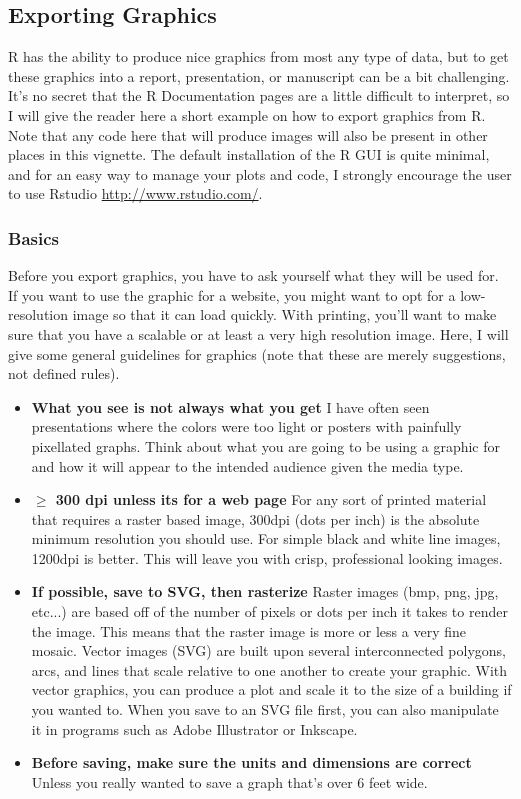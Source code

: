\documentclass[letterpaper]{article}
\newcommand{\tab}{\hspace*{1em}}
\begin{document}
\subsection{Exporting Graphics}\label{appendix:graphics}
\tab\tab R has the ability to produce nice graphics from most any type of data, but to get these graphics into a report, presentation, or manuscript can be a bit challenging. It's no secret that the R Documentation pages are a little difficult to interpret, so I will give the reader here a short example on how to export graphics from R. Note that any code here that will produce images will also be present in other places in this vignette. The default installation of the R GUI is quite minimal, and for an easy way to manage your plots and code, I strongly encourage the user to use Rstudio \url{http://www.rstudio.com/}.

\subsubsection{Basics}\label{appendix:graphics:basics}
\tab\tab Before you export graphics, you have to ask yourself what they will be used for. If you want to use the graphic for a website, you might want to opt for a low-resolution image so that it can load quickly. With printing, you'll want to make sure that you have a scalable or at least a very high resolution image. Here, I will give some general guidelines for graphics (note that these are merely suggestions, not defined rules).
\begin{itemize}
  \item \textbf{What you see is not always what you get} I have often seen presentations where the colors were too light or posters with painfully pixellated graphs. Think about what you are going to be using a graphic for and how it will appear to the intended audience given the media type.
  \item \textbf{$\geq$ 300 dpi unless its for a web page} For any sort of printed material that requires a raster based image, 300dpi (dots per inch) is the absolute minimum resolution you should use. For simple black and white line images, 1200dpi is better. This will leave you with crisp, professional looking images.
  \item \textbf{If possible, save to SVG, then rasterize} Raster images (bmp, png, jpg, etc...) are based off of the number of pixels or dots per inch it takes to render the image. This means that the raster image is more or less a very fine mosaic. Vector images (SVG) are built upon several interconnected polygons, arcs, and lines that scale relative to one another to create your graphic. With vector graphics, you can produce a plot and scale it to the size of a building if you wanted to. When you save to an SVG file first, you can also manipulate it in programs such as Adobe Illustrator or Inkscape. 
  \item \textbf{Before saving, make sure the units and dimensions are correct} Unless you really wanted to save a graph that's over 6 feet wide.
\end{itemize}
\end{document}
